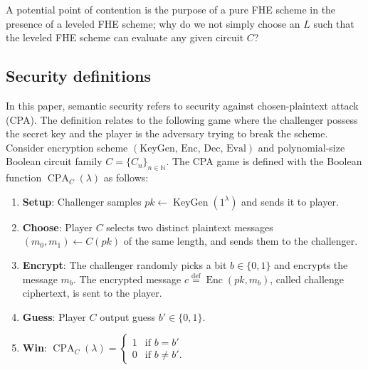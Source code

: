 A potential point of contention is the purpose of a pure FHE scheme in the presence of a leveled FHE scheme; why do we not simply choose an $L$ such that the leveled FHE scheme can evaluate any given circuit $C$?


\subsection*{Security definitions}

In this paper, semantic security refers to security against chosen-plaintext attack (CPA). The definition relates to the following game where the challenger possess the secret key and the player is the adversary trying to break the scheme. Consider encryption scheme $(\text{KeyGen, Enc, Dec, Eval})$ and polynomial-size Boolean circuit family $C = \{C_n\}_{n\in \mathbb{N}}$. The CPA game is defined with the Boolean function $\operatorname{CPA}_{C}(\lambda)$ as follows:
\begin{enumerate}
  \item \textbf{Setup}: Challenger samples $pk \leftarrow \operatorname{KeyGen}(1^{\lambda})$ and sends it to player.
  \item \textbf{Choose}: Player $C$ selects two distinct plaintext messages $(m_0, m_1) \leftarrow C(pk)$ of the same length, and sends them to the challenger.
  \item \textbf{Encrypt}: The challenger randomly picks a bit $b \in \{0, 1\}$ and encrypts the message $m_b$. The encrypted message $c \stackrel{\mathrm{def}}{=} \operatorname{Enc}(pk, m_b)$, called challenge ciphertext, is sent to the player.
  \item \textbf{Guess}: Player $C$ output guess $b' \in \{0,1\}$.
  \item \textbf{Win}: $\operatorname{CPA}_{C}(\lambda) = 
  \begin{cases}
  1 & \text{if } b = b'\\
  0 & \text{if } b \neq b'.
  \end{cases}$
\end{enumerate}

